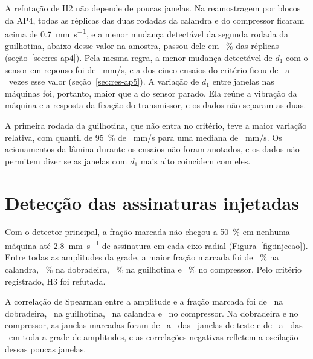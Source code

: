 A refutação de H2 não depende de poucas janelas. Na reamostragem por blocos da AP4, todas as réplicas das duas rodadas da calandra e do compressor ficaram acima de \SI{0,7}{\milli\meter\per\second}, e a menor mudança detectável da segunda rodada da guilhotina, abaixo desse valor na amostra, passou dele em \apQuatroAcimaGuilhotinaDois~\% das réplicas (seção~\ref{sec:res-ap4}). Pela mesma regra, a menor mudança detectável de $d_1$ com o sensor em repouso foi de \apCincoMmd~mm/s, e a dos cinco ensaios do critério ficou de \apCincoRazaoMin\ a \apCincoRazaoMax\ vezes esse valor (seção~\ref{sec:res-ap5}). A variação de $d_1$ entre janelas nas máquinas foi, portanto, maior que a do sensor parado. Ela reúne a vibração da máquina e a resposta da fixação do transmissor, e os dados não separam as duas.

A primeira rodada da guilhotina, que não entra no critério, teve a maior variação relativa, com quantil de \SI{95}{\percent} de \hDoisQGuilhotinaUm~mm/s para uma mediana de \hDoisMedianaGuilhotinaUm~mm/s. Os acionamentos da lâmina durante os ensaios não foram anotados, e os dados não permitem dizer se as janelas com $d_1$ mais alto coincidem com eles.

\section{Detecção das assinaturas injetadas}\label{sec:res-h3}

Com o detector principal, a fração marcada não chegou a \SI{50}{\percent} em nenhuma máquina até \SI{2,8}{\milli\meter\per\second} de assinatura em cada eixo radial (Figura~\ref{fig:injecao}). Entre todas as amplitudes da grade, a maior fração marcada foi de \hTresFracaoMaxCalandra~\% na calandra, \hTresFracaoMaxDobradeira~\% na dobradeira, \hTresFracaoMaxGuilhotina~\% na guilhotina e \hTresFracaoMaxCompressor~\% no compressor. Pelo critério registrado, H3 foi refutada.

A correlação de Spearman entre a amplitude e a fração marcada foi de \hTresRhoDobradeira\ na dobradeira, \hTresRhoGuilhotina\ na guilhotina, \hTresRhoCalandra\ na calandra e \hTresRhoCompressor\ no compressor. Na dobradeira e no compressor, as janelas marcadas foram de \hTresJanelasMinDobradeira\ a \hTresJanelasMaxDobradeira\ das \hTresTesteDobradeira\ janelas de teste e de \hTresJanelasMinCompressor\ a \hTresJanelasMaxCompressor\ das \hTresTesteCompressor\ em toda a grade de amplitudes, e as correlações negativas refletem a oscilação dessas poucas janelas.

